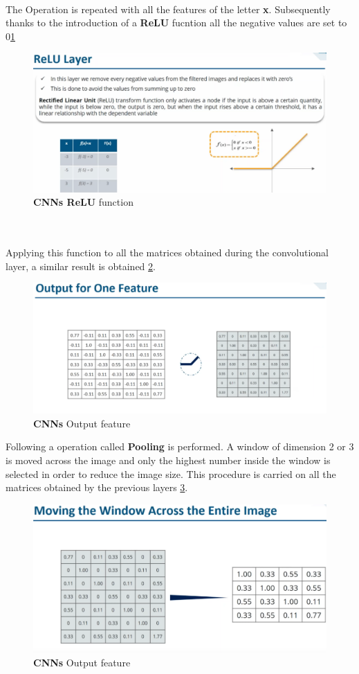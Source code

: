 \documentclass[11pt]{article}
\begin{document}
\\
The Operation is repeated with all the features of the letter \textbf{x}.
\clearpage
Subsequently thanks to the introduction of a \textbf{ReLU} fucntion all the negative values are set to 0\ref{fig:CNN9}
\begin{figure}[h]
\centering
\captionsetup{justification=centering}
\includegraphics[width=0.9\linewidth]{CNN9.pdf}
\caption{ \textbf{CNNs ReLU} function}
\label{fig:CNN9}
\end{figure}\\\\
Applying this function to all the matrices obtained during the convolutional layer, a similar result is obtained \ref{fig:CNN10}.
\begin{figure}[h]
\centering
\captionsetup{justification=centering}
\includegraphics[width=0.9\linewidth]{CNN10.pdf}
\caption{ \textbf{CNNs} Output feature }
\label{fig:CNN10}
\end{figure}
\clearpage
Following a operation called \textbf{Pooling} is performed. A window of dimension 2 or 3 is moved across the image and only the highest number inside the window  is selected in order to reduce the image size. This procedure is carried on all the matrices obtained by the previous layers \ref{fig:CNN11}.
\begin{figure}[h]
\centering
\captionsetup{justification=centering}
\includegraphics[width=0.9\linewidth]{CNN11.pdf}
\caption{ \textbf{CNNs} Output feature }
\label{fig:CNN11}
\end{figure}\\\\
\end{document}

